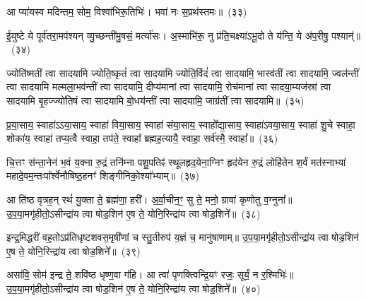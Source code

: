 {\anuvakamend[{त॒रणि॑र्विꣳश॒तिः}]}%

आ प्या॑यस्व मदिन्तम॒ सोम॒ विश्वा॑भिरू॒तिभिः॑। भवा॑ नः स॒प्रथ॑स्तमः॥~(३३)

{\anuvakamend[{आ प्या॑यस्व॒ नव॑}]}%

ई॒युष्टे ये पूर्व॑तरा॒मप॑श्यन् व्यु॒च्छन्ती॑मु॒षसं॒ मर्त्या॑सः। अ॒स्माभि॑रू॒ नु प्र॑ति॒चक्ष्या॑\-ऽभू॒दो ते य॑न्ति॒ ये अ॑प॒रीषु॒ पश्यान्॑॥~(३४)

{\anuvakamend[{ई॒युरेका॒न्नविꣳ॑शतिः}]}%

ज्योति॑ष्मतीं त्वा सादयामि ज्योति॒ष्कृतं॑ त्वा सादयामि ज्योति॒र्विदं॑ त्वा सादयामि॒ भास्व॑तीं त्वा सादयामि॒ ज्वल॑न्तीं त्वा सादयामि मल्मला॒भव॑न्तीं त्वा सादयामि॒ दीप्य॑मानां त्वा सादयामि॒ रोच॑मानां त्वा सादया॒म्यज॑स्रां त्वा सादयामि बृ॒हज्ज्यो॑तिषं त्वा सादयामि बो॒धय॑न्तीं त्वा सादयामि॒ जाग्र॑तीं त्वा सादयामि॥~(३५)

{\anuvakamend[{ज्योति॑ष्मती॒ꣳ॒ षट्त्रिꣳ॑शत्}]}%

प्र॒या॒साय॒ स्वाहा॑\-ऽऽ\-या॒साय॒ स्वाहा॑ विया॒साय॒ स्वाहा॑ संया॒साय॒ स्वाहो᳚द्या॒साय॒ स्वाहा॑\-ऽवया॒साय॒ स्वाहा॑ शु॒चे स्वाहा॒ शोका॑य॒ स्वाहा॑ तप्य॒त्वै स्वाहा॒ तप॑ते॒ स्वाहा᳚ ब्रह्मह॒त्यायै॒ स्वाहा॒ सर्व॑स्मै॒ स्वाहा᳚॥~(३६)

{\anuvakamend[{प्र॒या॒साय॒ चतु॑र्विꣳशतिः}]}%

चि॒त्तꣳ स॑न्ता॒नेन॑ भ॒वं य॒क्ना रु॒द्रं तनि॑म्ना पशु॒पतिꣴ॑ स्थूलहृद॒येना॒ग्निꣳ हृद॑येन रु॒द्रं लोहि॑तेन श॒र्वं मत॑स्नाभ्यां महादे॒व\-म॒न्तःपा᳚र्श्वेनौषिष्ठ॒\-हनꣳ॑ शिङ्गीनिको॒श्या᳚भ्याम्॥~(३७)

{\anuvakamend[{चि॒त्तम॒ष्टाद॑श}]}%

आ ति॑ष्ठ वृत्रह॒न् रथं॑ यु॒क्ता ते॒ ब्रह्म॑णा॒ हरी᳚। अ॒र्वा॒चीन॒ꣳ॒ सु ते॒ मनो॒ ग्रावा॑ कृणोतु व॒ग्नुना᳚॥ उ॒प॒या॒मगृ॑हीतो॒\-ऽसीन्द्रा॑य त्वा षोड॒शिन॑ ए॒ष ते॒ योनि॒रिन्द्रा॑य त्वा षोड॒शिने᳚॥~(३८)

{\anuvakamend[{आ ति॑ष्ठ॒ षड्विꣳ॑शतिः}]}%

इन्द्र॒मिद्धरी॑ वह॒तो\-ऽप्र॑तिधृष्टशवस॒मृषी॑णां च स्तु॒तीरुप॑ य॒ज्ञं च॒ मानु॑षाणाम्॥ उ॒प॒या॒मगृ॑हीतो॒\-ऽसीन्द्रा॑य त्वा षोड॒शिन॑ ए॒ष ते॒ योनि॒रिन्द्रा॑य त्वा षोड॒शिने᳚॥~(३९)

{\anuvakamend[{इन्द्र॒मित् त्रयो॑विꣳशतिः}]}%

असा॑वि॒ सोम॑ इन्द्र ते॒ शवि॑ष्ठ धृष्ण॒वा ग॑हि। आ त्वा॑ पृणक्त्विन्द्रि॒यꣳ रजः॒ सूर्यं॒ न र॒श्मिभिः॑॥ उ॒प॒या॒मगृ॑हीतो॒\-ऽसीन्द्रा॑य त्वा षोड॒शिन॑ ए॒ष ते॒ योनि॒रिन्द्रा॑य त्वा षोड॒शिने᳚॥~(४०)

